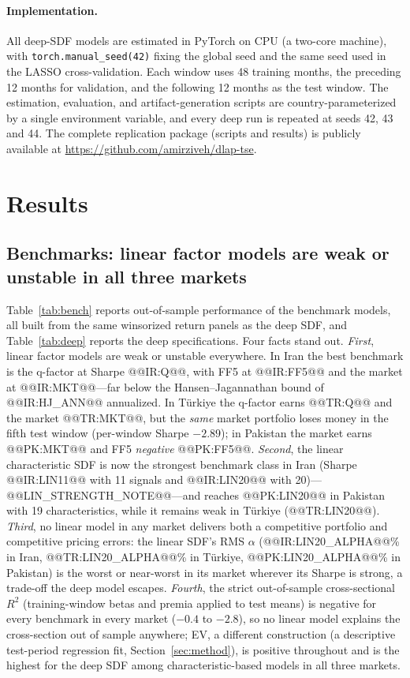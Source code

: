 \documentclass[12pt]{article}
\begin{document}
\paragraph{Implementation.} All deep-SDF models are estimated in PyTorch on CPU (a two-core machine), with \texttt{torch.manual\_seed(42)} fixing the global seed and the same seed used in the LASSO cross-validation. Each window uses 48 training months, the preceding 12 months for validation, and the following 12 months as the test window. The estimation, evaluation, and artifact-generation scripts are country-parameterized by a single environment variable, and every deep run is repeated at seeds 42, 43 and 44. The complete replication package (scripts and results) is publicly available at \url{https://github.com/amirziveh/dlap-tse}.

\section{Results}\label{sec:results}

\subsection{Benchmarks: linear factor models are weak or unstable in all three markets}\label{sec:bench}

Table~\ref{tab:bench} reports out-of-sample performance of the benchmark models, all built from the same winsorized return panels as the deep SDF, and Table~\ref{tab:deep} reports the deep specifications. Four facts stand out. \emph{First}, linear factor models are weak or unstable everywhere. In Iran the best benchmark is the q-factor at Sharpe @@IR:Q@@, with FF5 at @@IR:FF5@@ and the market at @@IR:MKT@@---far below the Hansen--Jagannathan bound of @@IR:HJ_ANN@@ annualized. In T\"urkiye the q-factor earns @@TR:Q@@ and the market @@TR:MKT@@, but the \emph{same} market portfolio loses money in the fifth test window (per-window Sharpe $-2.89$); in Pakistan the market earns @@PK:MKT@@ and FF5 \emph{negative} @@PK:FF5@@. \emph{Second}, the linear characteristic SDF is now the strongest benchmark class in Iran (Sharpe @@IR:LIN11@@ with 11 signals and @@IR:LIN20@@ with 20)---@@LIN_STRENGTH_NOTE@@---and reaches @@PK:LIN20@@ in Pakistan with 19 characteristics, while it remains weak in T\"urkiye (@@TR:LIN20@@). \emph{Third}, no linear model in any market delivers both a competitive portfolio and competitive pricing errors: the linear SDF's RMS $\alpha$ (@@IR:LIN20_ALPHA@@\% in Iran, @@TR:LIN20_ALPHA@@\% in T\"urkiye, @@PK:LIN20_ALPHA@@\% in Pakistan) is the worst or near-worst in its market wherever its Sharpe is strong, a trade-off the deep model escapes. \emph{Fourth}, the strict out-of-sample cross-sectional $R^2$ (training-window betas and premia applied to test means) is negative for every benchmark in every market ($-0.4$ to $-2.8$), so no linear model explains the cross-section out of sample anywhere; EV, a different construction (a descriptive test-period regression fit, Section~\ref{sec:method}), is positive throughout and is the highest for the deep SDF among characteristic-based models in all three markets.
\end{document}
